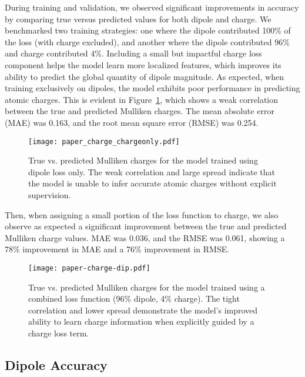 \documentclass[journal=jctcce,manuscript=article]{achemso}
\begin{document}
During training and validation, we observed significant improvements in accuracy by comparing true versus predicted values for both dipole and charge. We benchmarked two training strategies: one where the dipole contributed 100\% of the loss (with charge excluded), and another where the dipole contributed 96\% and charge contributed 4\%. Including a small but impactful charge loss component helps the model learn more localized features, which improves its ability to predict the global quantity of dipole magnitude. As expected, when training exclusively on dipoles, the model exhibits poor performance in predicting atomic charges. This is evident in Figure~\ref{fig:charge_only}, which shows a weak correlation between the true and predicted Mulliken charges. The mean absolute error (MAE) was 0.163, and the root mean square error (RMSE) was 0.254.

\begin{figure}[hptb]
    \centering
    \texttt{[image: paper\_charge\_chargeonly.pdf]}
    \caption{
        True vs. predicted Mulliken charges for the model trained using dipole loss only. The weak correlation and large spread indicate that the model is unable to infer accurate atomic charges without explicit supervision.
    }
    \label{fig:charge_only}
\end{figure}

Then, when assigning a small portion of the loss function to charge, we also observe as expected a significant improvement between the true and predicted Mulliken charge values. MAE was 0.036, and the RMSE was 0.061, showing a 78\% improvement in MAE and a 76\% improvement in RMSE.

\begin{figure}[hptb]
    \centering
    \texttt{[image: paper-charge-dip.pdf]}
    \caption{
        True vs. predicted Mulliken charges for the model trained using a combined loss function (96\% dipole, 4\% charge). The tight correlation and lower spread demonstrate the model's improved ability to learn charge information when explicitly guided by a charge loss term.
    }
    \label{fig:charge_combined}
\end{figure}

\subsection{Dipole Accuracy}
\end{document}
